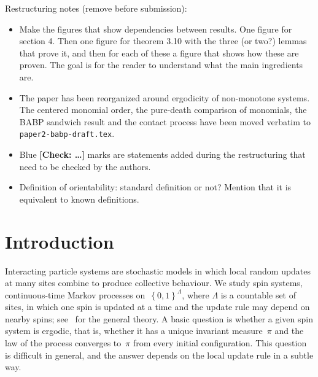 \documentclass[EJP,preprint,NODS,nobera]{ejpecp}
\newcommand{\cb}[1]{\left\{#1\right\}}
\begin{document}
\setcounter{tocdepth}{1}
\tableofcontents

{\color{red} Restructuring notes (remove before submission):
  \begin{itemize}
  \item Make the figures that show dependencies between results. One figure for section 4. Then one figure for theorem 3.10 with the three (or two?) lemmas that prove it, and then for each of these a figure that shows how these are proven. The goal is for the reader to understand what the main ingredients are.
  \item The paper has been reorganized around ergodicity of non-monotone
    systems. The centered monomial order, the pure-death comparison of
    monomials, the BABP sandwich result and the contact process have been
    moved verbatim to \texttt{paper2-babp-draft.tex}.
  \item Blue \textbf{[Check: \dots]} marks are statements added during the
    restructuring that need to be checked by the authors.
  \item Definition of orientability: standard definition or not? Mention
    that it is equivalent to known definitions.
  \end{itemize}
}

\section{Introduction}
\label{sec:introduction}

Interacting particle systems are stochastic models in which local random
updates at many sites combine to produce collective behaviour. We study spin
systems, continuous-time Markov processes on~$\cb{0,1}^{\Lambda}$, where
$\Lambda$ is a countable set of sites, in which one spin is updated at a time
and the update rule may depend on nearby spins; see~\cite{Liggett1985} for the
general theory. A basic question is whether a given spin system is ergodic,
that is, whether it has a unique invariant measure~$\pi$ and the law of the
process converges to~$\pi$ from every initial configuration. This question is
difficult in general, and the answer depends on the local update rule in a
subtle way.
\end{document}
